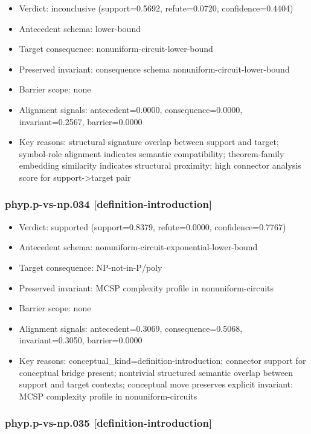 \documentclass[
]{article}
\newcounter{none} %
\providecommand{\tightlist}{%
  \setlength{\itemsep}{0pt}\setlength{\parskip}{0pt}}
\begin{document}
\begin{itemize}
\tightlist
\item
  Verdict: inconclusive (support=0.5692, refute=0.0720,
  confidence=0.4404)
\item
  Antecedent schema: lower-bound
\item
  Target consequence: nonuniform-circuit-lower-bound
\item
  Preserved invariant: consequence schema nonuniform-circuit-lower-bound
\item
  Barrier scope: none
\item
  Alignment signals: antecedent=0.0000, consequence=0.0000,
  invariant=0.2567, barrier=0.0000
\item
  Key reasons: structural signature overlap between support and target;
  symbol-role alignment indicates semantic compatibility; theorem-family
  embedding similarity indicates structural proximity; high connector
  analysis score for support-\textgreater target pair
\end{itemize}

\subsubsection{phyp.p-vs-np.034
{[}definition-introduction{]}}\label{phypp-vs-np034-definition-introduction}

\begin{itemize}
\tightlist
\item
  Verdict: supported (support=0.8379, refute=0.0000, confidence=0.7767)
\item
  Antecedent schema: nonuniform-circuit-exponential-lower-bound
\item
  Target consequence: NP-not-in-P/poly
\item
  Preserved invariant: MCSP complexity profile in nonuniform-circuits
\item
  Barrier scope: none
\item
  Alignment signals: antecedent=0.3069, consequence=0.5068,
  invariant=0.3050, barrier=0.0000
\item
  Key reasons: conceptual\_kind=definition-introduction; connector
  support for conceptual bridge present; nontrivial structured semantic
  overlap between support and target contexts; conceptual move preserves
  explicit invariant: MCSP complexity profile in nonuniform-circuits
\end{itemize}

\subsubsection{phyp.p-vs-np.035
{[}definition-introduction{]}}\label{phypp-vs-np035-definition-introduction}
\end{document}
